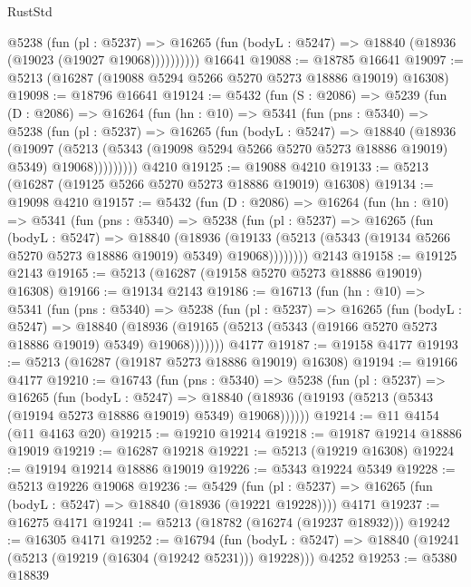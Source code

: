 \begin{lexlean}{RustStd}
\begin{coremodule}
            @5238
              (fun (pl : @5237) =>
              @16265 (fun (bodyL : @5247) => @18840 (@18936 (@19023 (@19027 @19068))))))))))
    @16641
@19088 := @18785 @16641
@19097 := @5213 (@16287 (@19088 @5294 @5266 @5270 @5273 @18886 @19019) @16308)
@19098 := @18796 @16641
@19124 := @5432
    (fun (S : @2086) =>
    @5239
      (fun (D : @2086) =>
      @16264
        (fun (hn : @10) =>
        @5341
          (fun (pns : @5340) =>
          @5238
            (fun (pl : @5237) =>
            @16265
              (fun (bodyL : @5247) =>
              @18840
                (@18936
                  (@19097
                    (@5213
                      (@5343 (@19098 @5294 @5266 @5270 @5273 @18886 @19019) @5349)
                      @19068)))))))))
    @4210
@19125 := @19088 @4210
@19133 := @5213 (@16287 (@19125 @5266 @5270 @5273 @18886 @19019) @16308)
@19134 := @19098 @4210
@19157 := @5432
    (fun (D : @2086) =>
    @16264
      (fun (hn : @10) =>
      @5341
        (fun (pns : @5340) =>
        @5238
          (fun (pl : @5237) =>
          @16265
            (fun (bodyL : @5247) =>
            @18840
              (@18936
                (@19133 (@5213 (@5343 (@19134 @5266 @5270 @5273 @18886 @19019) @5349) @19068))))))))
    @2143
@19158 := @19125 @2143
@19165 := @5213 (@16287 (@19158 @5270 @5273 @18886 @19019) @16308)
@19166 := @19134 @2143
@19186 := @16713
    (fun (hn : @10) =>
    @5341
      (fun (pns : @5340) =>
      @5238
        (fun (pl : @5237) =>
        @16265
          (fun (bodyL : @5247) =>
          @18840
            (@18936 (@19165 (@5213 (@5343 (@19166 @5270 @5273 @18886 @19019) @5349) @19068)))))))
    @4177
@19187 := @19158 @4177
@19193 := @5213 (@16287 (@19187 @5273 @18886 @19019) @16308)
@19194 := @19166 @4177
@19210 := @16743
    (fun (pns : @5340) =>
    @5238
      (fun (pl : @5237) =>
      @16265
        (fun (bodyL : @5247) =>
        @18840 (@18936 (@19193 (@5213 (@5343 (@19194 @5273 @18886 @19019) @5349) @19068))))))
@19214 := @11 @4154 (@11 @4163 @20)
@19215 := @19210 @19214
@19218 := @19187 @19214 @18886 @19019
@19219 := @16287 @19218
@19221 := @5213 (@19219 @16308)
@19224 := @19194 @19214 @18886 @19019
@19226 := @5343 @19224 @5349
@19228 := @5213 @19226 @19068
@19236 := @5429
    (fun (pl : @5237) => @16265 (fun (bodyL : @5247) => @18840 (@18936 (@19221 @19228))))
    @4171
@19237 := @16275 @4171
@19241 := @5213 (@18782 (@16274 (@19237 @18932)))
@19242 := @16305 @4171
@19252 := @16794
    (fun (bodyL : @5247) => @18840 (@19241 (@5213 (@19219 (@16304 (@19242 @5231))) @19228)))
    @4252
@19253 := @5380 @18839

\end{coremodule}
\end{lexlean}
